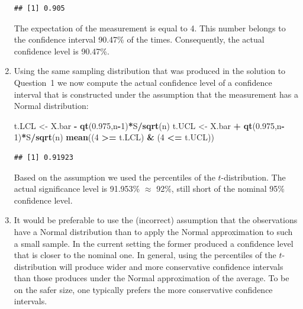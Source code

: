 \documentclass[]{krantz}
\makeatletter
\newenvironment{Shaded}{\begin{snugshade}}{\end{snugshade}}
\newcommand{\KeywordTok}[1]{\textcolor[rgb]{0.13,0.29,0.53}{\textbf{#1}}}
\newcommand{\DecValTok}[1]{\textcolor[rgb]{0.00,0.00,0.81}{#1}}
\newcommand{\FloatTok}[1]{\textcolor[rgb]{0.00,0.00,0.81}{#1}}
\newcommand{\StringTok}[1]{\textcolor[rgb]{0.31,0.60,0.02}{#1}}
\newcommand{\OperatorTok}[1]{\textcolor[rgb]{0.81,0.36,0.00}{\textbf{#1}}}
\newcommand{\NormalTok}[1]{#1}
\newenvironment{kframe}{%
\medskip{}
\setlength{\fboxsep}{.8em}
 \def\at@end@of@kframe{}%
 \ifinner\ifhmode%
  \def\at@end@of@kframe{\end{minipage}}%
  \begin{minipage}{\columnwidth}%
 \fi\fi%
 \def\FrameCommand##1{\hskip\@totalleftmargin \hskip-\fboxsep
 \colorbox{shadecolor}{##1}\hskip-\fboxsep
     \hskip-\linewidth \hskip-\@totalleftmargin \hskip\columnwidth}%
 \MakeFramed {\advance\hsize-\width
   \@totalleftmargin\z@ \linewidth\hsize
   \@setminipage}}%
 {\par\unskip\endMakeFramed%
 \at@end@of@kframe}
\renewenvironment{Shaded}{\begin{kframe}}{\end{kframe}}
\theoremstyle{definition}
\theoremstyle{definition}
\theoremstyle{definition}
\theoremstyle{remark}
\makeatother
\begin{document}
\begin{enumerate}
\begin{verbatim}
## [1] 0.905
\end{verbatim}

  The expectation of the measurement is equal to 4. This number belongs
  to the confidence interval 90.47\% of the times. Consequently, the
  actual confidence level is 90.47\%.
\item
  Using the same sampling distribution that was produced in the solution
  to Question~1 we now compute the actual confidence level of a
  confidence interval that is constructed under the assumption that the
  measurement has a Normal distribution:

\begin{Shaded}
\begin{Highlighting}[]
\NormalTok{t.LCL <-}\StringTok{ }\NormalTok{X.bar }\OperatorTok{-}\StringTok{ }\KeywordTok{qt}\NormalTok{(}\FloatTok{0.975}\NormalTok{,n}\OperatorTok{-}\DecValTok{1}\NormalTok{)}\OperatorTok{*}\NormalTok{S}\OperatorTok{/}\KeywordTok{sqrt}\NormalTok{(n)}
\NormalTok{t.UCL <-}\StringTok{ }\NormalTok{X.bar }\OperatorTok{+}\StringTok{ }\KeywordTok{qt}\NormalTok{(}\FloatTok{0.975}\NormalTok{,n}\OperatorTok{-}\DecValTok{1}\NormalTok{)}\OperatorTok{*}\NormalTok{S}\OperatorTok{/}\KeywordTok{sqrt}\NormalTok{(n)}
\KeywordTok{mean}\NormalTok{((}\DecValTok{4} \OperatorTok{>=}\StringTok{ }\NormalTok{t.LCL) }\OperatorTok{&}\StringTok{ }\NormalTok{(}\DecValTok{4} \OperatorTok{<=}\StringTok{ }\NormalTok{t.UCL))}
\end{Highlighting}
\end{Shaded}

\begin{verbatim}
## [1] 0.91923
\end{verbatim}

  Based on the assumption we used the percentiles of the
  \(t\)-distribution. The actual significance level is 91.953\%
  \(\approx\) 92\%, still short of the nominal 95\% confidence level.
\item
  It would be preferable to use the (incorrect) assumption that the
  observations have a Normal distribution than to apply the Normal
  approximation to such a small sample. In the current setting the
  former produced a confidence level that is closer to the nominal one.
  In general, using the percentiles of the \(t\)-distribution will
  produce wider and more conservative confidence intervals than those
  produces under the Normal approximation of the average. To be on the
  safer size, one typically prefers the more conservative confidence
  intervals.
\end{enumerate}
\end{document}
